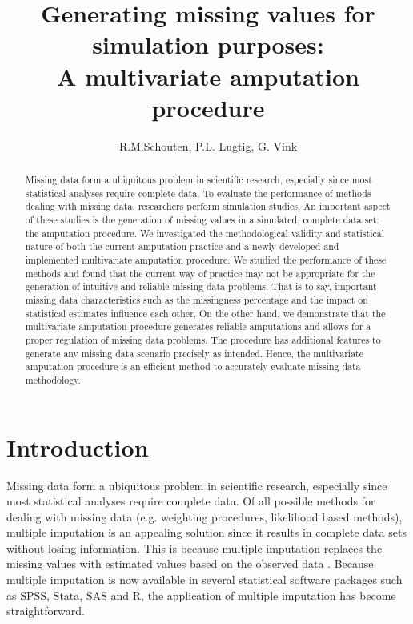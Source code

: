\documentclass[11pt,a4paper]{article}
\begin{document}
\title{\LARGE\bf Generating missing values for simulation purposes:\\ A multivariate amputation procedure}
\author{R.M.Schouten, P.L. Lugtig, G. Vink}
\date{}
\maketitle

\begin{abstract}

Missing data form a ubiquitous problem in scientific research, especially since most statistical analyses require complete data. To evaluate the performance of methods dealing with missing data, researchers perform simulation studies. An important aspect of these studies is the generation of missing values in a simulated, complete data set: the amputation procedure. We investigated the methodological validity and statistical nature of both the current amputation practice and a newly developed and implemented multivariate amputation procedure. We studied the performance of these methods and found that the current way of practice may not be appropriate for the generation of intuitive and reliable missing data problems. That is to say, important missing data characteristics such as the missingness percentage and the impact on statistical estimates influence each other. On the other hand, we demonstrate that the multivariate amputation procedure generates reliable amputations and allows for a proper regulation of missing data problems. The procedure has additional features to generate any missing data scenario precisely as intended. Hence, the multivariate amputation procedure is an efficient method to accurately evaluate missing data methodology.

\end{abstract}

\section{Introduction}

Missing data form a ubiquitous problem in scientific research, especially since most statistical analyses require complete data. Of all possible methods for dealing with missing data (e.g. weighting procedures, likelihood based methods), multiple imputation is an appealing solution since it results in complete data sets without losing information. This is because multiple imputation replaces the missing values with estimated values based on the observed data \citep{Rubin1987, Rubin1996, Stef2012}. Because multiple imputation is now available in several statistical software packages such as SPSS, Stata, SAS and R, the application of multiple imputation has become straightforward. 
\end{document}
